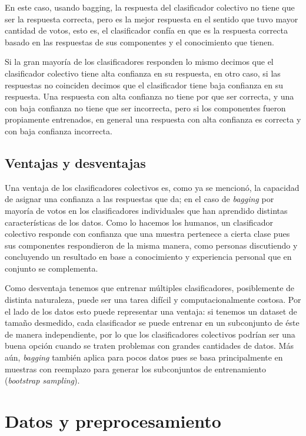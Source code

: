 \documentclass[spanish,11pt,letterpaper]{article}
\begin{document}
En este caso, usando bagging, la respuesta del clasificador colectivo no tiene
que ser la respuesta correcta, pero es la mejor respuesta en el sentido que
tuvo mayor cantidad de votos, esto es, el clasificador confía en que es la
respuesta correcta basado en las respuestas de sus componentes y el conocimiento
que tienen.

Si la gran mayoría de los clasificadores responden lo mismo decimos que el clasificador
colectivo tiene alta confianza en su respuesta, en otro caso, si las respuestas
no coinciden decimos que el clasificador tiene baja confianza en su respuesta.
Una respuesta con alta confianza no tiene por que ser correcta, y una con baja
confianza no tiene que ser incorrecta, pero si los componentes fueron propiamente
entrenados, en general una respuesta con alta confianza es correcta y con baja
confianza incorrecta\cite{scholarpedia}.

\subsection{Ventajas y desventajas}

Una ventaja de los clasificadores colectivos es, como ya se mencionó, la capacidad
de asignar una confianza a las respuestas que da; en el caso de \textit{bagging}
por mayoría de votos en los clasificadores individuales que han aprendido
distintas características de los datos. Como lo hacemos los humanos, un clasificador
colectivo responde con confianza que una muestra pertenece a cierta clase pues
sus componentes respondieron de la misma manera, como personas discutiendo
y concluyendo un resultado en base a conocimiento y experiencia personal que
en conjunto se complementa.

Como desventaja tenemos que entrenar múltiples clasificadores, posiblemente de
distinta naturaleza, puede ser una tarea difícil y computacionalmente costosa.
Por el lado de los datos esto puede representar una ventaja: si tenemos un dataset
de tamaño desmedido, cada clasificador se puede entrenar en un subconjunto de éste
de manera independiente, por lo que los clasificadores colectivos podrían ser
una buena opción cuando se traten problemas con grandes cantidades de datos. Más aún,
\textit{bagging} también aplica para pocos datos pues se basa principalmente en
muestras con reemplazo para generar los subconjuntos de entrenamiento
(\textit{bootstrap sampling}).

\section{Datos y preprocesamiento}
\end{document}
